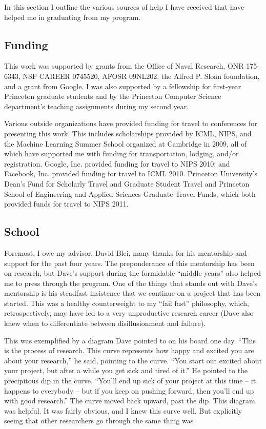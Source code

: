 In this section I outline the various sources of help I have received
that have helped me in graduating from my program.

\subsection*{Funding}
This work was supported by grants from the Office of Naval Research,
ONR 175-6343, NSF CAREER 0745520, AFOSR 09NL202, the Alfred P. Sloan
foundation, and a grant from Google.  I was also supported by a
fellowship for first-year Princeton graduate students and by the
Princeton Computer Science department's teaching assignments during my
second year.

Various outside organizations have provided funding for travel to
conferences for presenting this work.  This includes scholarships
provided by ICML, NIPS, and the Machine Learning Summer School
organized at Cambridge in 2009, all of which have supported me with
funding for transportation, lodging, and/or registration.  Google,
Inc. provided funding for travel to NIPS 2010; and Facebook,
Inc. provided funding for travel to ICML 2010.  Princeton University's
Dean's Fund for Scholarly Travel and Graduate Student Travel and
Princeton School of Engineering and Applied Sciences Graduate Travel
Funds, which both provided funds for travel to NIPS 2011.

\subsection*{School}
Foremost, I owe my advisor, David Blei, many thanks for his mentorship
and support for the past four years.  The preponderance of this
mentorship has been on research, but Dave's support during the
formidable ``middle years'' also helped me to press through the
program.  One of the things that stands out with Dave's mentorship is
his steadfast insistence that we continue on a project that has been
started.  This was a healthy counterweight to my ``fail fast''
philosophy, which, retrospectively, may have led to a very
unproductive research career (Dave also knew when to differentiate
between disillusionment and failure).

This was exemplified by a diagram Dave pointed to on his board one
day.  ``This is the process of research.  This curve represents how
happy and excited you are about your research,'' he said, pointing to
the curve.  ``You start out excited about your project, but after a
while you get sick and tired of it.''  He pointed to the precipitous
dip in the curve.  ``You'll end up sick of your project at this time
-- it happens to everybody -- but if you keep on pushing forward, then
you'll end up with good research.''  The curve moved back upward, past
the dip.  This diagram was helpful.  It was fairly obvious, and I knew
this curve well.  But explicitly seeing that other researchers go
through the same thing was 

